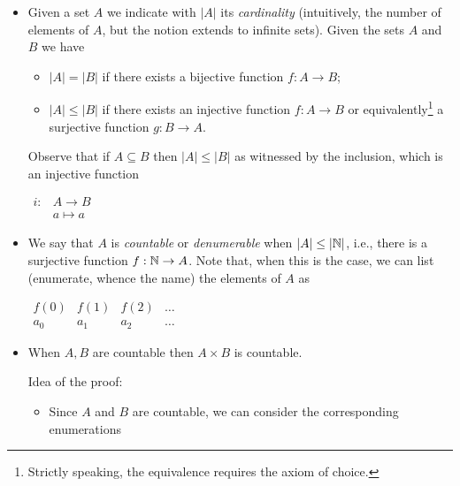 \begin{itemize}
\item Given a set $A$ we indicate with $|A|$ its \emph{cardinality}
  (intuitively, the number of elements of $A$, but the notion extends
  to infinite sets). Given the sets $A$ and $B$ we have
  \begin{itemize}
  \item $|A| = |B|$ if there exists a bijective function $f : A \to B$;
  \item $|A| \leq |B|$ if there exists an injective function
    $f: A \to B$ or equivalently\footnote{Strictly speaking,
      the equivalence requires the axiom of choice.} a surjective
    function $g : B \to A$.
  \end{itemize}
  Observe that if $A \subseteq B$ then $|A| \leq |B|$ as witnessed by
  the inclusion, which is an injective function
  \begin{center}
    $\begin{array}{cc}
       i: & A \to B  \\
          & a \mapsto a
     \end{array}$
   \end{center}

\item We say that $A$ is \emph{countable} or \emph{denumerable} when
  $|A| \leq |\mathbb{N}|$, i.e., there is a surjective function
  $f: \mathbb{N} \to A$. Note that, when this is the case, we can
  list (enumerate, whence the name) the elements of $A$ as
  \begin{center}
    $\begin{array}{cccc}
      f(0) & f(1) & f(2) & \dots\\
      a_0  & a_1  & a_2 & \dots
    \end{array}
    $
  \end{center}

\item When $A, B$ are countable then $A\times B$ is countable.

  Idea of the proof:
  \begin{itemize}
  \item Since $A$ and $B$ are countable, we can consider the
    corresponding enumerations


\end{itemize}
\end{itemize}
